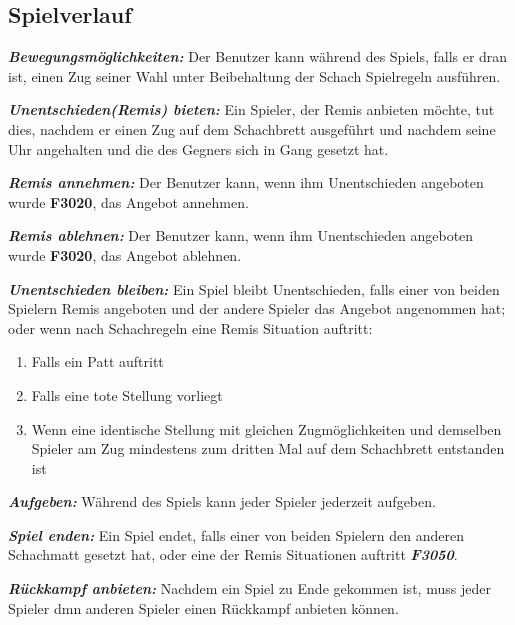 \documentclass[parskip=full]{scrartcl}
\begin{document}
\subsection{Spielverlauf} 
\begin{description}
	\hypertarget{F3010}{\item[F3010]}\textbf{\textit{Bewegungsmöglichkeiten: }} Der Benutzer kann während des Spiels, falls er dran ist, einen Zug seiner Wahl unter Beibehaltung der Schach Spielregeln ausführen.
	\item[F3020] \textbf{\textit{Unentschieden(Remis) bieten: }} Ein Spieler, der Remis anbieten möchte, tut dies, nachdem er einen Zug auf dem Schachbrett ausgeführt und nachdem seine Uhr angehalten und die des Gegners sich in Gang gesetzt hat.
	\item[F3030] \textbf{\textit{Remis annehmen: }} Der Benutzer kann, wenn ihm Unentschieden angeboten wurde \textbf{F3020}, das Angebot annehmen.
	
	\item[F3040] \textbf{\textit{Remis ablehnen: }} Der Benutzer kann, wenn ihm Unentschieden angeboten wurde \textbf{F3020}, das Angebot ablehnen.
	
	\item[F3050] \textbf{\textit{Unentschieden bleiben: }}
	Ein Spiel bleibt Unentschieden, falls einer von beiden Spielern Remis angeboten und der andere Spieler das Angebot angenommen hat; oder wenn nach Schachregeln eine Remis Situation auftritt:
	\begin{enumerate}
		\item Falls ein \gls{Patt} auftritt
		\item Falls eine \gls{tote Stellung} vorliegt
		\item Wenn eine identische Stellung mit gleichen Zugmöglichkeiten und demselben Spieler am Zug mindestens zum dritten Mal auf dem Schachbrett entstanden ist 
	\end{enumerate}
	
	\item[F3060] \textbf{\textit{Aufgeben: }} Während des Spiels kann jeder Spieler jederzeit aufgeben.
	\item[F3070] \textbf{\textit{Spiel enden: }} Ein Spiel endet, falls einer von beiden Spielern den anderen Schachmatt gesetzt hat, oder eine der Remis Situationen auftritt \textbf{\textit{F3050}}.
	\item[F3080] \textbf{\textit{Rückkampf anbieten: }} Nachdem ein Spiel zu Ende gekommen ist, muss jeder Spieler dmn anderen Spieler einen Rückkampf anbieten können.
\end{description}
\newpage
\end{document}

